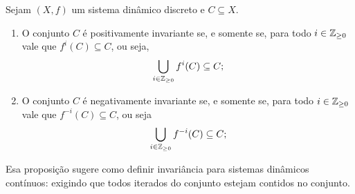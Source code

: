 \begin{exercise}
Sejam $(X,f)$ um sistema dinâmico discreto e $C \subseteq X$.
	\begin{enumerate}
	\item O conjunto $C$ é positivamente invariante se, e somente se, para todo $i \in \mathbb{Z}_{\geq 0}$ vale que $f^i(C) \subseteq C$, ou seja,
		\begin{align*}
		\bigcup_{i \in \mathbb{Z}_{\geq 0}} f^i(C) \subseteq C;
		\end{align*}
	\item O conjunto $C$ é negativamente invariante se, e somente se, para todo $i \in \mathbb{Z}_{\geq 0}$ vale que $f^{-i}(C) \subseteq C$, ou seja
		\begin{equation*}
		\bigcup_{i \in \mathbb{Z}_{\geq 0}} f^{-i}(C) \subseteq C;
		\end{equation*}
	\end{enumerate}
\end{exercise}
\begin{comment}
\begin{proof}
	\begin{enumerate}
	\item Mostraremos por indução que, para todo $t \in \Z_{\geq 0}$, $f^t(C) \subseteq C$. Para $t=0$, temos que $f^0(C) = C \subseteq C$. Agora seja $t \in \Z_{>0}$ e suponha que $f^{t-1}(C) \subseteq C$. Então, como $f(C) \subseteq C$,
		\begin{equation*}
		f^t(C) = f^{t-1}(f(C)) \subseteq f(C) \subseteq C.
		\end{equation*}

	\item A mesma demonstração vale ao substituir $f^t$ por $f^{-t}$.
	\end{enumerate}
\end{proof}
\end{comment}

Esa proposição sugere como definir invariância para sistemas dinâmicos contínuos: exigindo que todos iterados do conjunto estejam contidos no conjunto.

\begin{comment}
\begin{definition}
Seja $\Sist = (X,f)$ um sistema dinâmico. Um conjunto \emph{invariante} de $\Sist$ é um conjunto $C \subseteq X$ tal que $f^t(C) \subseteq C$ para todo $t \in T$. Um conjunto \emph{positivamente invariante} de $\Sist$ é um conjunto $C \subseteq X$ tal que $f^t(C) \subseteq C$ para todo $t \in T^+$. Um conjunto \emph{negativamente invariante} de $\Sist$ é um conjunto $C \subseteq X$ tal que $f^{-t}(C) \subseteq C$ para todo $t \in T^+$.
\end{definition}
\end{comment}

